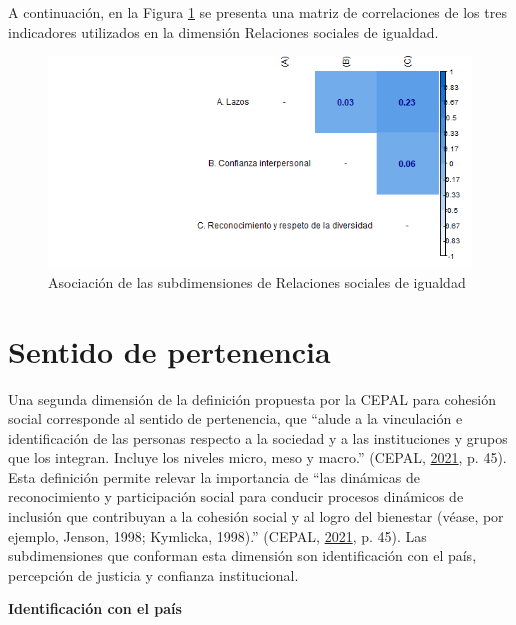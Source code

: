 \documentclass[
  12pt,
]{book}
\begin{document}
A continuación, en la Figura \ref{fig:relaciones-igualdad} se presenta una matriz de correlaciones de los tres indicadores utilizados en la dimensión Relaciones sociales de igualdad.

\begin{figure}[H]

{\centering \includegraphics[width=1\linewidth,height=1\textheight]{output/graphs/relaciones_cor} 

}

\caption{Asociación de las subdimensiones de Relaciones sociales de igualdad}\label{fig:relaciones-igualdad}
\end{figure}

\hypertarget{sentido-de-pertenencia}{%
\section{Sentido de pertenencia}\label{sentido-de-pertenencia}}

Una segunda dimensión de la definición propuesta por la CEPAL para cohesión social corresponde al sentido de pertenencia, que ``alude a la vinculación e identificación de las personas respecto a la sociedad y a las instituciones y grupos que los integran. Incluye los niveles micro, meso y macro.'' (CEPAL, \protect\hyperlink{ref-cepal_cohesion_2021}{2021}, p. 45). Esta definición permite relevar la importancia de ``las dinámicas de reconocimiento y participación social para conducir procesos dinámicos de inclusión que contribuyan a la cohesión social y al logro del bienestar (véase, por ejemplo, Jenson, 1998; Kymlicka, 1998).'' (CEPAL, \protect\hyperlink{ref-cepal_cohesion_2021}{2021}, p. 45). Las subdimensiones que conforman esta dimensión son identificación con el país, percepción de justicia y confianza institucional.

\textbf{Identificación con el país}
\end{document}
